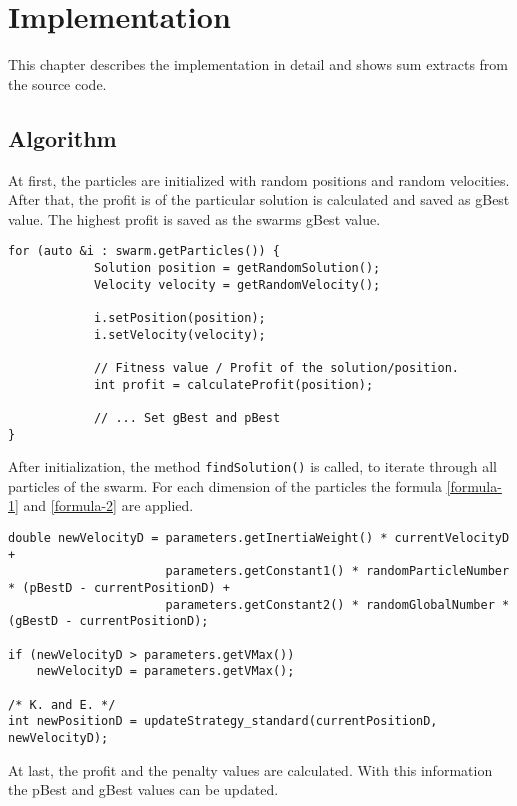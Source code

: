 \documentclass{article}
\begin{document}
\section{Implementation}
\label{lbl-impl}
This chapter describes the implementation in detail and shows sum extracts from the source code.

\subsection{Algorithm}
At first, the particles are initialized with random positions and random velocities. After that, the profit is of the particular solution is calculated and saved as gBest value. The highest profit is saved as the swarms gBest value.

\begin{lstlisting}[caption="Solver.cpp"]
for (auto &i : swarm.getParticles()) {
            Solution position = getRandomSolution();
            Velocity velocity = getRandomVelocity();

            i.setPosition(position);
            i.setVelocity(velocity);

            // Fitness value / Profit of the solution/position.
            int profit = calculateProfit(position);
            
            // ... Set gBest and pBest
}
\end{lstlisting}

After initialization, the method \lstinline$findSolution()$ is called, to iterate through all particles of the swarm. For each dimension of the particles the formula \ref{formula-1} and \ref{formula-2} are applied.

\begin{lstlisting}[caption="Solver.cpp"]
double newVelocityD = parameters.getInertiaWeight() * currentVelocityD +
                      parameters.getConstant1() * randomParticleNumber * (pBestD - currentPositionD) +
                      parameters.getConstant2() * randomGlobalNumber * (gBestD - currentPositionD);

if (newVelocityD > parameters.getVMax())
	newVelocityD = parameters.getVMax();

/* K. and E. */
int newPositionD = updateStrategy_standard(currentPositionD, newVelocityD);
\end{lstlisting}

At last, the profit and the penalty values are calculated. With this information the pBest and gBest values can be updated.
\end{document}
